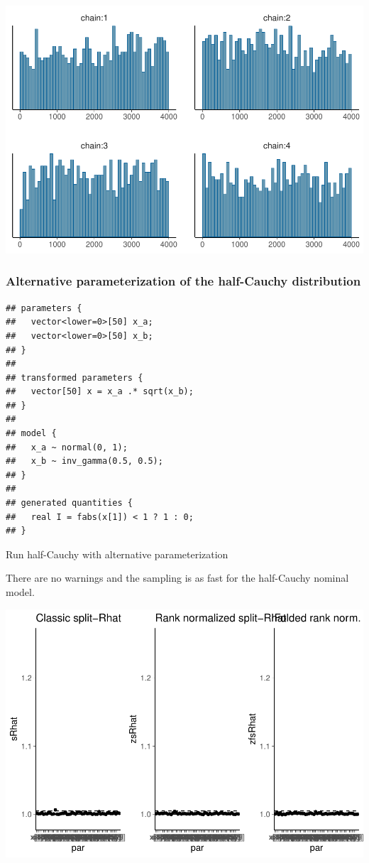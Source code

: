 \documentclass[american,]{article}
\begin{document}
\includegraphics{graphics/hist-fit-half-nom-lp-1.pdf}

\hypertarget{alternative-parameterization-of-the-half-cauchy-distribution}{%
\subsubsection*{Alternative parameterization of the half-Cauchy
distribution}\label{alternative-parameterization-of-the-half-cauchy-distribution}}

\begin{verbatim}
## parameters {
##   vector<lower=0>[50] x_a;
##   vector<lower=0>[50] x_b;
## }
## 
## transformed parameters {
##   vector[50] x = x_a .* sqrt(x_b);
## }
## 
## model {
##   x_a ~ normal(0, 1);
##   x_b ~ inv_gamma(0.5, 0.5);
## }
## 
## generated quantities {
##   real I = fabs(x[1]) < 1 ? 1 : 0;
## }
\end{verbatim}

Run half-Cauchy with alternative parameterization

There are no warnings and the sampling is as fast for the half-Cauchy
nominal model.

\includegraphics{graphics/rhat-fit-half-reparam-1.pdf}
\end{document}
